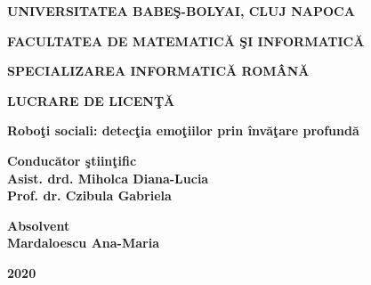 \documentclass[runningheads,a4paper,12pt]{report}
\begin{document}
\begin{titlepage}
\sloppy
\begin{center}
\Large \textbf{UNIVERSITATEA BABE\c S-BOLYAI, CLUJ NAPOCA}

\Large \textbf{FACULTATEA DE MATEMATIC\u A \c SI INFORMATIC\u A}

\Large \textbf{SPECIALIZAREA INFORMATIC\u A ROM\^ AN\u A}

\vspace{4cm}

\LARGE \textbf{LUCRARE DE LICEN\c T\u A}

\vspace{0.5cm}

\LARGE \textbf {Robo\c ti sociali: detec\c tia emo\c tiilor   prin \^ inv\u a\c tare profund\u a}

\end{center}

\vspace{3cm}

\begin{flushleft}
\LARGE{\textbf{Conduc\u ator \c stiin\c tific}}\\
\LARGE{\textbf{Asist. drd. Miholca Diana-Lucia}}\\
\LARGE{\textbf{Prof. dr. Czibula Gabriela}}
\end{flushleft}

\vspace{0.3cm}

\begin{flushright}
\LARGE{\textbf{Absolvent}}\\
\LARGE{\textbf{Mardaloescu Ana-Maria}}
\end{flushright}

\vspace{3cm}

\begin{center}
\LARGE{\textbf{2020}}
\end{center}

\newpage

\end{titlepage}
\end{document}
